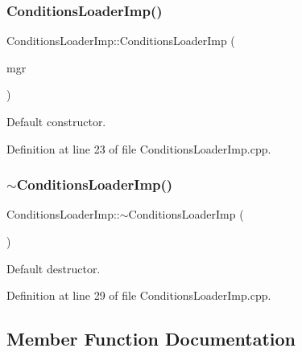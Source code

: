 \subsubsection{\texorpdfstring{Conditions\+Loader\+Imp()}{ConditionsLoaderImp()}}
{\footnotesize\ttfamily Conditions\+Loader\+Imp\+::\+Conditions\+Loader\+Imp (\begin{DoxyParamCaption}\item[{\hyperlink{class_d_d4hep_1_1_conditions_1_1_conditions_manager}{Conditions\+Manager}}]{mgr }\end{DoxyParamCaption})}



Default constructor. 



Definition at line 23 of file Conditions\+Loader\+Imp.\+cpp.

\hypertarget{class_d_d4hep_1_1_conditions_1_1_conditions_loader_imp_aff5e22b90011ae57c1ea4a5685ada304}{}\label{class_d_d4hep_1_1_conditions_1_1_conditions_loader_imp_aff5e22b90011ae57c1ea4a5685ada304} 
\subsubsection{\texorpdfstring{$\sim$\+Conditions\+Loader\+Imp()}{~ConditionsLoaderImp()}}
{\footnotesize\ttfamily Conditions\+Loader\+Imp\+::$\sim$\+Conditions\+Loader\+Imp (\begin{DoxyParamCaption}{ }\end{DoxyParamCaption})\hspace{0.3cm}{\ttfamily [virtual]}}



Default destructor. 



Definition at line 29 of file Conditions\+Loader\+Imp.\+cpp.



\subsection{Member Function Documentation}
\hypertarget{class_d_d4hep_1_1_conditions_1_1_conditions_loader_imp_a6302206e3ebcdf712425df5468598e2c}{}\label{class_d_d4hep_1_1_conditions_1_1_conditions_loader_imp_a6302206e3ebcdf712425df5468598e2c} 
